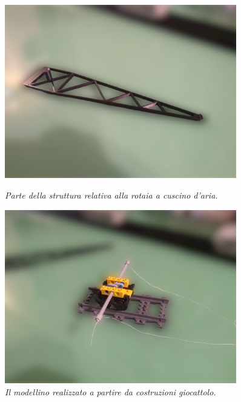 \documentclass[11pt, a4paper, twoside, italian]{article}
\begin{document}
\begin{figure}[h!]
  \centering
\begin{minipage}{0.45\textwidth}
  \centering
  \includegraphics[width=0.9\textwidth]{../../media/img/crane_air-processed.png}
  \caption{\textit{Parte della struttura relativa alla rotaia a cuscino d'aria.}}
  \label{photo_crane_air}
\end{minipage}
\begin{minipage}{0.45\textwidth}
  \centering
  \includegraphics[width=0.9\textwidth]{../../media/img/lego_cart-processed.png}
  \caption{\textit{Il modellino realizzato a partire da costruzioni giocattolo.}}
  \label{photo_lego}
\end{minipage}
\end{figure}
\end{document}
